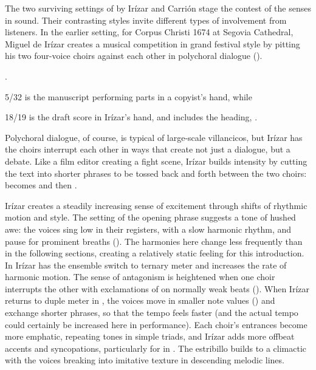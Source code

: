 
The two surviving settings of  by Irízar and Carrión stage the contest of the senses in sound.
Their contrasting styles invite different types of involvement from listeners.
In the earlier setting, for Corpus Christi 1674 at Segovia Cathedral, Miguel de Irízar creates a musical competition in grand festival style by pitting his two four-voice choirs against each other in polychoral dialogue ().%
\begin{Footnote}
    \Autocite[\XXX]{Cashner:SingingAboutSingingI}.
    \signature{E-SE}{5/32} is the manuscript performing parts in a copyist's hand, while \signature{E-SE}{18/19} is the draft score in Irízar's hand, and includes the heading, .
\end{Footnote}
Polychoral dialogue, of course, is typical of large-scale villancicos, but Irízar has the choirs interrupt each other in ways that create not just a dialogue, but a debate.
Like a film editor creating a fight scene, Irízar builds intensity by cutting the text into shorter phrases to be tossed back and forth between the two choirs:  becomes  and then .


Irízar creates a steadily increasing sense of excitement through shifts of rhythmic motion and style.
The setting of the opening phrase suggests a tone of hushed awe: the voices sing low in their registers, with a slow harmonic rhythm, and pause for prominent breaths ().
The harmonies here change less frequently than in the following sections, creating a relatively static feeling for this introduction.
In  Irízar has the ensemble switch to ternary meter and increases the rate of harmonic motion.
The sense of antagonism is heightened when one choir interrupts the other with exclamations of  on normally weak beats ().
When Irízar returns to duple meter in , the voices move in smaller note values () and exchange shorter phrases, so that the tempo feels faster (and the actual tempo could certainly be increased here in performance).
Each choir's entrances become more emphatic, repeating tones in simple triads, and Irízar adds more offbeat accents and syncopations, particularly for  in .
The estribillo builds to a climactic  with the voices breaking into imitative texture in descending melodic lines.

